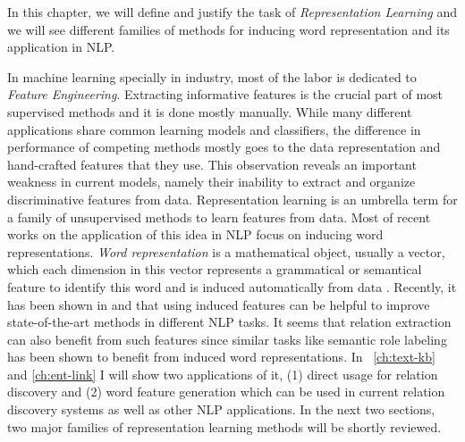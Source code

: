 In this chapter, we will define and justify the task of
\emph{Representation Learning} and we will see different families of methods for
inducing word representation and its application in NLP.

In machine learning specially in industry, most of the labor is dedicated to
\emph{Feature Engineering}. Extracting informative features is the crucial part
of most supervised methods and it is done mostly manually. While many different
applications share common learning models and classifiers, the difference in
performance of competing methods mostly goes to the data representation and
hand-crafted features that they use. This observation reveals an important
weakness in current models, namely their inability to extract and organize
discriminative features from data. Representation learning is an umbrella term
for a family of unsupervised methods to learn features from data. Most of recent
works on the application of this idea in NLP focus on inducing word
representations. \emph{Word representation} is a mathematical object, usually a
vector, which each dimension in this vector represents a grammatical or
semantical feature to identify this word and is induced automatically from data
\cite{Turian2010b}. Recently, it has been shown in \cite{Turian2010b} and \cite{Collobert2011} that using
 induced features can be helpful to improve state-of-the-art methods in 
different NLP tasks. It seems that relation extraction can also benefit from such features since similar tasks like 
semantic role labeling has been shown to benefit from
induced word representations. In ~\autoref{ch:text-kb} and \autoref{ch:ent-link} I
will show two applications of it, (1) direct usage for relation discovery and
(2) word feature generation which can be used in current relation discovery
systems as well as other NLP applications.
In the next two sections, two major families of representation learning methods
will be shortly reviewed.

